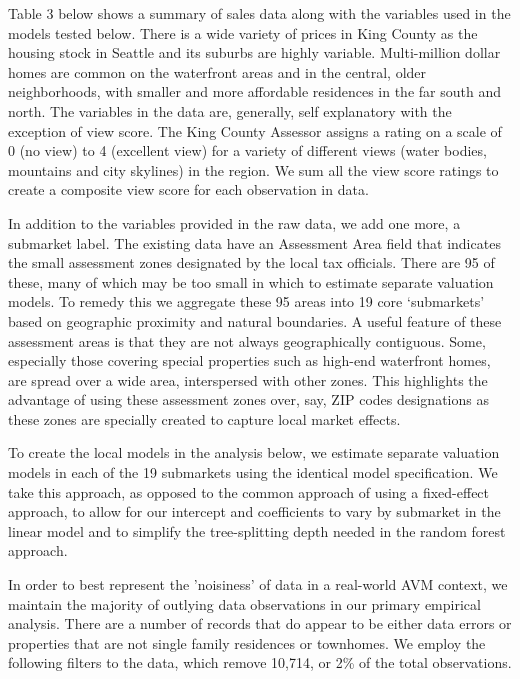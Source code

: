 \documentclass[colTwo]{anon}
\theoremstyle{definition}
\begin{document}
Table 3 below shows a summary of sales data along with the variables used in the models tested below. There is a wide variety of prices in King County as the housing stock in Seattle and its suburbs are highly variable.  Multi-million dollar homes are common on the waterfront areas and in the central, older neighborhoods, with smaller and more affordable residences in the far south and north.  The variables in the data are, generally, self explanatory with the exception of view score. The King County Assessor assigns a rating on a scale of 0 (no view) to 4 (excellent view) for a variety of different views (water bodies, mountains and city skylines) in the region. We sum all the view score ratings to create a composite view score for each observation in data.  

In addition to the variables provided in the raw data, we add one more, a submarket label.  The existing data have an Assessment Area field that indicates the small assessment zones designated by the local tax officials.  There are 95 of these, many of which may be too small in which to estimate separate valuation models.  To remedy this we aggregate these 95 areas into 19 core ‘submarkets’ based on geographic proximity and natural boundaries. A useful feature of these assessment areas is that they are not always geographically contiguous.  Some, especially those covering special properties such as high-end waterfront homes, are spread over a wide area, interspersed with other zones.  This highlights the advantage of using these assessment zones over, say, ZIP codes designations as these zones are specially created to capture local market effects.

To create the local models in the analysis below, we estimate separate valuation models in each of the 19 submarkets using the identical model specification.  We take this approach, as opposed to the common approach of using a fixed-effect approach, to allow for our intercept and coefficients to vary by submarket in the linear model and to simplify the tree-splitting depth needed in the random forest approach. 

In order to best represent the 'noisiness' of data in a real-world AVM context, we maintain the majority of outlying data observations in our primary empirical analysis. There are a number of records that do appear to be either data errors or properties that are not single family residences or townhomes.  We employ the following filters to the data, which remove 10,714, or 2\% of the total observations.
\end{document}
